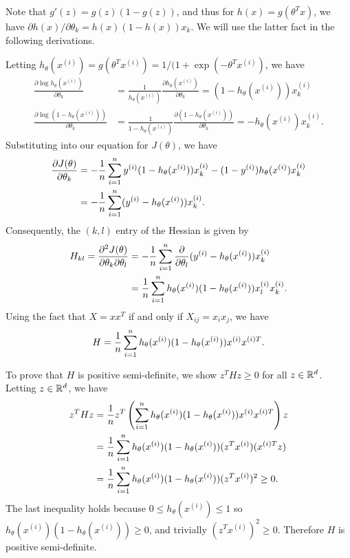 \begin{answer}
	
	Note that $g'(z) = g(z)(1-g(z))$, and thus for $h(x) = g(\theta^T x)$, we have
	$\partial h(x) / \partial \theta_k = h(x)(1 - h(x)) x_k$. We will use the
	latter fact in the following derivations.
	
	Letting $h_{\theta}(x^{(i)}) = g(\theta^T x^{(i)})
	= 1/(1 + \exp(-\theta^T x^{(i)})$, we have
	\begin{align*}
		\frac{\partial\log h_{\theta}(x^{(i)})}{\partial\theta_k}
		& = \frac{1}{h_{\theta}(x^{(i)})}\frac{\partial
	h_{\theta}(x^{(i)})}{\partial\theta_k}
		= (1 - h_{\theta}(x^{(i)}))x^{(i)}_k\\
		\frac{\partial\log(1 - h_{\theta}(x^{(i)}))}{\partial\theta_k}
		& = \frac{1}{1 - h_{\theta}(x^{(i)})}
		    \frac{\partial(1 -h_{\theta}(x^{(i)}))}{\partial\theta_k}
	   = -h_{\theta}(x^{(i)})x^{(i)}_k.
	\end{align*}
	Substituting into our equation for $J(\theta)$, we have
	\begin{align*}
		\frac{\partial J(\theta)}{\partial\theta_k}
		& = -\frac{1}{{n}}\sum_{i = 1}^{{n}}y^{(i)}(1 - h_{\theta}(x^{(i)}))x^{(i)}_k
			- (1 - y^{(i)})h_{\theta}(x^{(i)})x^{(i)}_k\\
		& = -\frac{1}{{n}}\sum_{i = 1}^{{n}}(y^{(i)} - h_{\theta}(x^{(i)}))x^{(i)}_k.
	\end{align*}
	Consequently, the $(k, l)$ entry of the Hessian is given by
	\begin{align*}
		H_{kl} = \frac{\partial^2 J(\theta)}{\partial\theta_k\partial\theta_l}
		& = -\frac{1}{{n}}\sum_{i = 1}^{{n}}
			\frac{\partial}{\partial\theta_l}(y^{(i)} - h_{\theta}(x^{(i)}))x^{(i)}_k\\
		& = \frac{1}{{n}}\sum_{i = 1}^{{n}}
			h_{\theta}(x^{(i)})(1 - h_{\theta}(x^{(i)}))x^{(i)}_l x^{(i)}_k.
	\end{align*}
	Using the fact that $X = xx^T$ if and only if $X_{ij} = x_i x_j$, we have
	\begin{equation*}
		H = \frac{1}{{n}}\sum_{i = 1}^{{n}}
			h_{\theta}(x^{(i)})(1 - h_{\theta}(x^{(i)}))x^{(i)} x^{(i)T}.
	\end{equation*}
	
	To prove that $H$ is positive semi-definite, we show $z^T Hz \ge 0$ for all
	$z\in{\mathbb R}^{d}$. Letting $z\in{\mathbb R}^{d}$, we have
	\begin{align*}
		z^T H z
		& = \frac{1}{{n}}z^T\left(\sum_{i = 1}^{{n}}
			h_{\theta}(x^{(i)})(1 - h_{\theta}(x^{(i)}))x^{(i)} x^{(i)T}\right)z\\
		& = \frac{1}{{n}}\sum_{i = 1}^{{n}}
			h_{\theta}(x^{(i)})(1 - h_{\theta}(x^{(i)}))(z^Tx^{(i)})(x^{(i)T}z)\\
		& = \frac{1}{{n}}\sum_{i = 1}^{{n}}
			h_{\theta}(x^{(i)})(1 - h_{\theta}(x^{(i)}))(z^Tx^{(i)})^2
		\ge 0.
	\end{align*}
	The last inequality holds because $0\le h_{\theta}(x^{(i)})\le 1$ so
	$h_{\theta}(x^{(i)})(1 - h_{\theta}(x^{(i)})) \ge 0$, and trivially
	$(z^Tx^{(i)})^2 \ge 0$. Therefore $H$ is positive semi-definite.
\end{answer}
